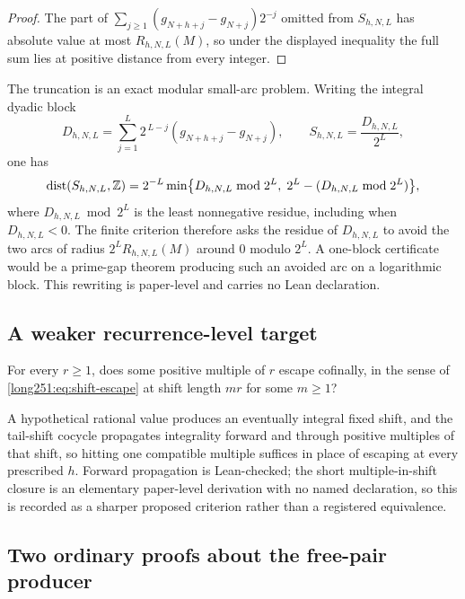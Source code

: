 \documentclass[11pt]{article}
\begin{document}
\begin{proof}
The part of $\sum_{j\ge1}(g_{N+h+j}-g_{N+j})2^{-j}$ omitted from $S_{h,N,L}$
has absolute value at most $R_{h,N,L}(M)$, so under the displayed inequality
the full sum lies at positive distance from every integer.
\end{proof}

The truncation is an exact modular small-arc problem.  Writing the integral
dyadic block
\[
 D_{h,N,L}=\sum_{j=1}^{L}2^{\,L-j}(g_{N+h+j}-g_{N+j}),
 \qquad S_{h,N,L}=\frac{D_{h,N,L}}{2^{L}},
\]
one has
\[
 \operatorname{dist}(S_{h,N,L},\mathbb{Z})
 =2^{-L}\min\bigl\{D_{h,N,L}\bmod2^{L},\;
 2^{L}-(D_{h,N,L}\bmod2^{L})\bigr\},
\]
where $D_{h,N,L}\bmod2^{L}$ is the least nonnegative residue, including when
$D_{h,N,L}<0$.  The finite criterion therefore asks the residue of
$D_{h,N,L}$ to avoid the two arcs of radius $2^{L}R_{h,N,L}(M)$ around $0$
modulo $2^{L}$.  A one-block certificate would be a prime-gap theorem
producing such an avoided arc on a logarithmic block.  This rewriting is
paper-level and carries no Lean declaration.

\subsection{A weaker recurrence-level target}\label{long251:sec:xr-divisorhit}

\begin{problem}\label{long251:xr:divisor-hit}
For every $r\ge1$, does some positive multiple of $r$ escape cofinally, in the
sense of \eqref{long251:eq:shift-escape} at shift length $mr$ for some $m\ge1$?
\end{problem}

A hypothetical rational value produces an eventually integral fixed shift, and
the tail-shift cocycle propagates integrality forward and through positive
multiples of that shift, so hitting one compatible multiple suffices in place
of escaping at every prescribed $h$.  Forward propagation is Lean-checked; the
short multiple-in-shift closure is an elementary paper-level derivation with no
named declaration, so this is recorded as a sharper proposed criterion rather
than a registered equivalence.

\subsection{Two ordinary proofs about the free-pair producer}
\label{long251:sec:xr-compression}
\end{document}
